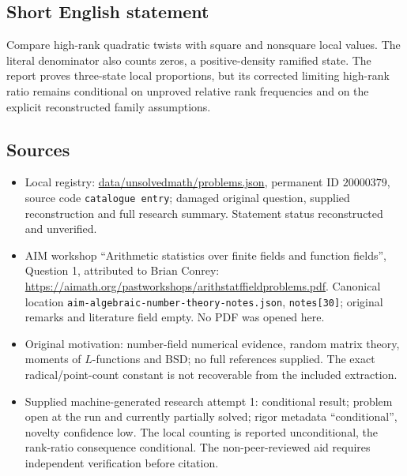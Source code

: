 \documentclass[11pt]{article}
\begin{document}
\subsection{Short English statement}
Compare high-rank quadratic twists with square and nonsquare local values. The literal denominator also counts zeros, a positive-density ramified state. The report proves three-state local proportions, but its corrected limiting high-rank ratio remains conditional on unproved relative rank frequencies and on the explicit reconstructed family assumptions.
\subsection{Sources}
\begin{itemize}
\item Local registry: \url{data/unsolvedmath/problems.json}, permanent ID $20000379$, source code \texttt{catalogue entry}; damaged original question, supplied reconstruction and full research summary. Statement status reconstructed and unverified.
\item AIM workshop ``Arithmetic statistics over finite fields and function fields'', Question 1, attributed to Brian Conrey: \url{https://aimath.org/pastworkshops/arithstatffieldproblems.pdf}. Canonical location \texttt{aim-algebraic-number-theory-notes.json}, \texttt{notes[30]}; original remarks and literature field empty. No PDF was opened here.
\item Original motivation: number-field numerical evidence, random matrix theory, moments of $L$-functions and BSD; no full references supplied. The exact radical/point-count constant is not recoverable from the included extraction.
\item Supplied machine-generated research attempt 1: conditional result; problem open at the run and currently partially solved; rigor metadata ``conditional'', novelty confidence low. The local counting is reported unconditional, the rank-ratio consequence conditional. The non-peer-reviewed aid requires independent verification before citation.
\end{itemize}
\end{document}
